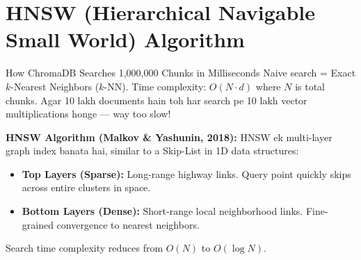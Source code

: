 \documentclass[11pt,a4paper,twoside]{report}
\begin{document}
\section{HNSW (Hierarchical Navigable Small World) Algorithm}

\begin{conceptbox}{How ChromaDB Searches 1,000,000 Chunks in Milliseconds}
Naive search = Exact $k$-Nearest Neighbors ($k$-NN). Time complexity: $O(N \cdot d)$ where $N$ is total chunks. Agar 10 lakh documents hain toh har search pe 10 lakh vector multiplications honge --- way too slow!

\textbf{HNSW Algorithm (Malkov \& Yashunin, 2018):}
HNSW ek multi-layer graph index banata hai, similar to a Skip-List in 1D data structures:
\begin{itemize}
    \item \textbf{Top Layers (Sparse):} Long-range highway links. Query point quickly skips across entire clusters in space.
    \item \textbf{Bottom Layers (Dense):} Short-range local neighborhood links. Fine-grained convergence to nearest neighbors.
\end{itemize}
Search time complexity reduces from $O(N)$ to \textbf{$O(\log N)$}.
\end{conceptbox}
\end{document}
